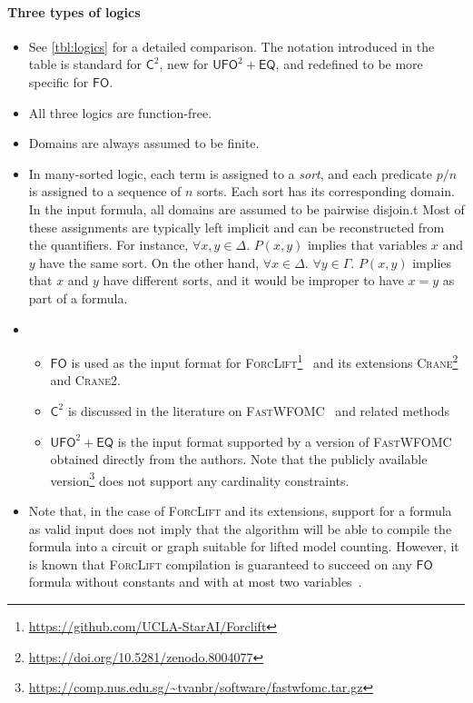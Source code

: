\documentclass{article}
\theoremstyle{definition}
\newcommand{\Ctwo}{$\mathsf{C}^{2}$}
\newcommand{\FO}{$\mathsf{FO}$}
\newcommand{\UFO}{$\mathsf{UFO}^{2} + \mathsf{EQ}$}
\newcommand{\Cranetwo}{\textsc{Crane2}}
\begin{document}
\paragraph{Three types of logics}
\begin{itemize}
  \item See \cref{tbl:logics} for a detailed comparison. The notation introduced
        in the table is standard for \Ctwo{}, new for \UFO{}, and redefined to
        be more specific for \FO{}.
  \item All three logics are function-free.
  \item Domains are always assumed to be finite.
  \item In many-sorted logic, each term is assigned to a \emph{sort}, and each
        predicate $p/n$ is assigned to a sequence of $n$ sorts. Each sort has
        its corresponding domain. In the input formula, all domains are assumed
        to be pairwise disjoin.t Most of these assignments are typically left
        implicit and can be reconstructed from the quantifiers. For instance,
        $\forall x,y \in \Delta\text{. }P(x, y)$ implies that variables $x$ and
        $y$ have the same sort. On the other hand, $\forall x \in \Delta\text{.
        }\forall y \in \Gamma\text{. } P(x, y)$ implies that $x$ and $y$ have
        different sorts, and it would be improper to have $x = y$ as part of a
        formula.
  \item
        \begin{itemize}
          \item \FO{} is used as the input format for
                \textsc{ForcLift}\footnote{\url{https://github.com/UCLA-StarAI/Forclift}}~\cite{DBLP:conf/ijcai/BroeckTMDR11}
                and its extensions
                \textsc{Crane}\footnote{\url{https://doi.org/10.5281/zenodo.8004077}}~\cite{DBLP:conf/kr/DilkasB23}
                and \Cranetwo{}.
          \item \Ctwo{} is discussed in the literature on
                \textsc{FastWFOMC}~\cite{DBLP:conf/uai/BremenK21} and related
                methods~\cite{DBLP:journals/jair/Kuzelka21,DBLP:conf/aaai/MalhotraS22}
          \item \UFO{} is the input format supported by a version of
                \textsc{FastWFOMC} obtained directly from the authors. Note that
                the publicly available
                version\footnote{\url{https://comp.nus.edu.sg/~tvanbr/software/fastwfomc.tar.gz}}
                does not support any cardinality constraints.
        \end{itemize}
  \item Note that, in the case of \textsc{ForcLift} and its extensions, support
        for a formula as valid input does not imply that the algorithm will be
        able to compile the formula into a circuit or graph suitable for lifted
        model counting. However, it is known that \textsc{ForcLift} compilation
        is guaranteed to succeed on any \FO{} formula without constants and with
        at most two variables~\cite{DBLP:conf/nips/Broeck11}.
\end{itemize}
\end{document}
